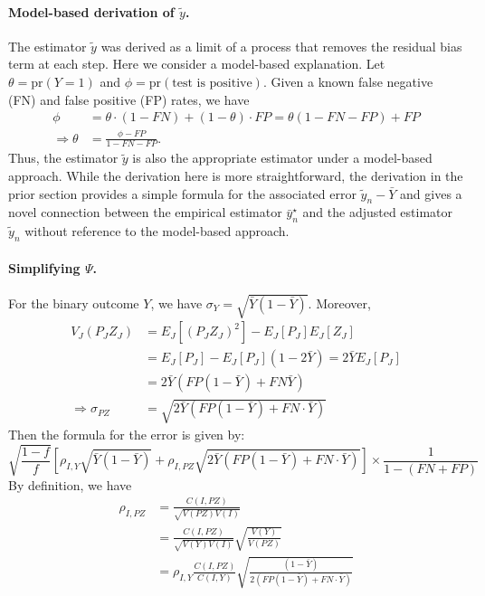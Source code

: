 \documentclass[12pt]{article}
\def\pr{\text{pr}}
\begin{document}
\paragraph*{Model-based derivation of $\tilde y$.}
The estimator $\tilde y$ was derived as a limit of a process that removes the residual bias term at each step.  Here we consider a model-based explanation.  Let $\theta = \pr( Y = 1)$ and $\phi = \pr( \text{test is positive})$.  Given a known false negative (FN) and false positive (FP) rates, we have
$$
\begin{aligned}
\phi &= \theta \cdot (1-FN) + (1-\theta) \cdot FP = \theta (1-FN-FP) + FP \\
\Rightarrow \theta &= \frac{\phi - FP}{1-FN-FP}.
\end{aligned}
$$
Thus, the estimator $\tilde y$ is also the appropriate estimator under a model-based approach.  While the derivation here is more straightforward, the derivation in the prior section provides a simple formula for the associated error $\tilde y_n - \bar Y$ and gives a novel connection between the empirical estimator $\bar y_n^\star$ and the adjusted estimator $\tilde y_n$ without reference to the model-based approach.

\paragraph*{Simplifying $\Psi$.}
For the binary outcome $Y$, we have $\sigma_Y = \sqrt{\bar Y (1-\bar Y)}$. Moreover,
$$
\begin{aligned}
V_J(P_J Z_J) &= E_J[(P_J Z_J)^2] - E_J[P_J] E_J[Z_J] \\
&= E_J[P_J] - E_J[P_J] (1 - 2 \bar Y) = 2 \bar Y E_J [ P_J ] \\
&= 2 \bar Y \left( FP (1-\bar Y) + FN \bar Y \right) \\
\Rightarrow \sigma_{PZ} &= \sqrt{ 2 \bar Y \left( FP (1-\bar Y) + FN \cdot  \bar Y \right) }
\end{aligned}
$$
Then the formula for the error is given by:
\begin{equation}
\label{eq:finalstep}
\sqrt{\frac{1-f}{f}} \left[\rho_{I,Y} \sqrt{\bar Y (1-\bar Y)} + \rho_{I, PZ} \sqrt{ 2 \bar Y \left( FP (1-\bar Y) + FN \cdot \bar Y \right )} \right] \times \frac{1}{1- (FN+FP)}
\end{equation}
By definition, we have
$$
\begin{aligned}
\rho_{I,PZ} &= \frac{C(I, PZ)}{\sqrt{V(PZ) V(I)}} \\
&= \frac{C(I, PZ)}{\sqrt{V(Y) V(I)}} \sqrt{\frac{V(Y)}{V(PZ)}} \\
&= \rho_{I,Y} \frac{C(I,PZ)}{C(I,Y)} \sqrt{ \frac{(1-\bar Y)}{2 ( FP (1-\bar Y) + FN \cdot \bar Y)} }
\end{aligned}
$$
\end{document}
